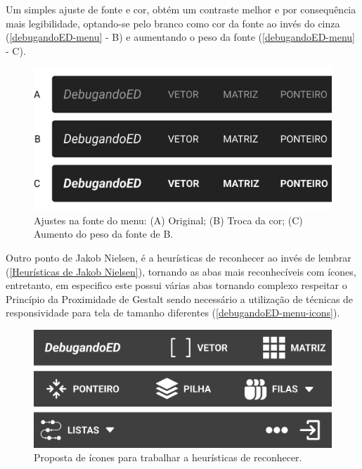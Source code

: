 Um simples ajuste de fonte e cor, obtém um contraste melhor e por consequência mais legibilidade, optando-se pelo branco como cor da fonte ao invés do cinza (\autoref{debugandoED-menu} - B) e aumentando o peso da fonte (\autoref{debugandoED-menu} - C).
    
    \begin{figure}[htb]
        \begin{center}
    	    \includegraphics[scale=1]{figs/debugandoED-menu.png}
    	\end{center}
        \caption{\label{debugandoED-menu}Ajustes na fonte do menu: (A) Original; (B) Troca da cor; (C) Aumento do peso da fonte de B.}
    \end{figure}
    
 Outro ponto de Jakob Nielsen, é a heurísticas de reconhecer ao invés de lembrar (\autoref{Heurísticas de Jakob Nielsen}), tornando as abas mais reconhecíveis com ícones, entretanto, em especifico este possui várias abas tornando complexo respeitar o Princípio da Proximidade de Gestalt sendo necessário a utilização de técnicas de responsividade para tela de tamanho diferentes (\autoref{debugandoED-menu-icons}).
 
\begin{figure}[htb]
    \begin{center}
        \includegraphics[scale=1]{figs/debugandoED-menu-icons.png}
    \end{center}
    \caption{\label{debugandoED-menu-icons}Proposta de ícones para trabalhar a heurísticas de reconhecer.}
\end{figure}

